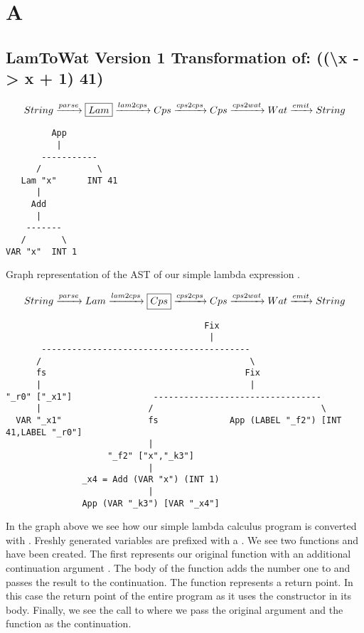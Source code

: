 

\chapter{\label{apdx:a}A}

\section{\label{section:v1printsimple}LamToWat Version 1 Transformation of: ((\textbackslash x -> x + 1) 41)}
\begin{landscape}
\begin{gather*}
  String \xrightarrow{parse} \boxed{Lam} \xrightarrow{lam2cps} Cps \xrightarrow{cps2cps} Cps \xrightarrow{cps2wat} Wat \xrightarrow{emit} String
\end{gather*}
\begin{lstlisting}
         App
          |
       -----------
      /           \
   Lam "x"      INT 41
      |
     Add
      |
    -------
   /       \
VAR "x"  INT 1

\end{lstlisting}
Graph representation of the AST of our simple lambda expression .
\end{landscape}
\clearpage

\begin{landscape}
\begin{gather*}
  String \xrightarrow{parse} Lam \xrightarrow{lam2cps} \boxed{Cps} \xrightarrow{cps2cps} Cps \xrightarrow{cps2wat} Wat \xrightarrow{emit} String
\end{gather*}

\begin{lstlisting}
                                       Fix
                                        |
       -----------------------------------------
      /                                         \
      fs                                       Fix
      |                                         |
"_r0" ["_x1"]                ---------------------------------
      |                     /                                 \
  VAR "_x1"                 fs              App (LABEL "_f2") [INT 41,LABEL "_r0"]
                            |
                    "_f2" ["x","_k3"]
                            |
               _x4 = Add (VAR "x") (INT 1)
                            |
               App (VAR "_k3") [VAR "_x4"]

\end{lstlisting}
In the graph above we see how our simple lambda calculus program is converted with . Freshly generated variables are prefixed with a \icode{_}. We see two functions  and  have been created. The first represents our original function with an additional continuation argument . The body of the function adds the number one to  and passes the result to the continuation. The  function represents a return point. In this case the return point of the entire program as it uses the  constructor in its body. Finally, we see the call to  where we pass the original argument and the  function as the continuation.
\end{landscape}
\clearpage

